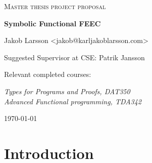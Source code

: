 \documentclass{scrartcl}
\begin{document}
\begin{titlepage}


\centering


{\scshape\LARGE Master thesis project proposal\\}

\vspace{0.5cm}

{\huge\bfseries Symbolic Functional FEEC\\}

\vspace{2cm}

{\Large Jakob Larsson <jakob@karljakoblarsson.com>\\}


\vspace{1.0cm}

{\large Suggested Supervisor at CSE: Patrik Jansson \\}



\vspace{1.5cm}

{\large Relevant completed courses:\par}

{\itshape
Types for Programs and Proofs, DAT350 \\
Advanced Functional programming, TDA342 \\
}


\vfill
{\large \today\\}
\end{titlepage}


%
%

\section{Introduction}

\end{document}
